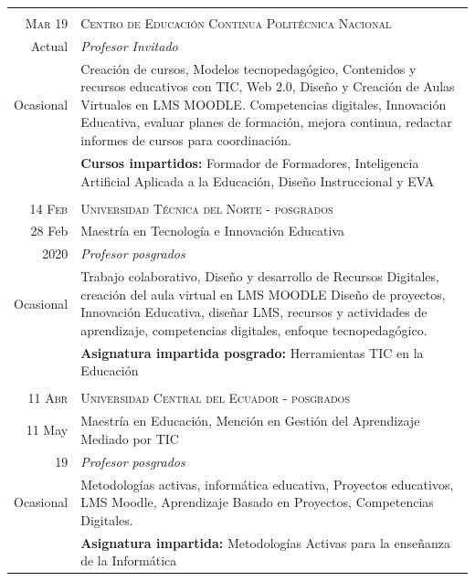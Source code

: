 \documentclass[a4paper]{article}
\begin{document}
\begin{longtable}{r|p{12cm}}
\multicolumn{2}{c}{} \\
\textsc{Mar 19} & \textsc{Centro de Educación Continua Politécnica Nacional} \\Actual
&\emph{Profesor Invitado}\\Ocasional&\footnotesize{Creación de cursos, Modelos tecnopedagógico, Contenidos y recursos educativos con TIC, Web 2.0, Diseño y Creación de Aulas Virtuales en LMS MOODLE. Competencias digitales, Innovación Educativa, evaluar planes de formación, mejora continua, redactar informes de cursos para coordinación.}\\ & \footnotesize{\textbf{Cursos impartidos:} Formador de Formadores, Inteligencia Artificial Aplicada a la Educación, Diseño Instruccional y EVA}\\

\multicolumn{2}{c}{} \\
\textsc{14 Feb} & \textsc{Universidad Técnica del Norte - posgrados} \\28 Feb& Maestría en Tecnología e Innovación Educativa\\
2020&\emph{Profesor posgrados}\\Ocasional&\footnotesize{Trabajo colaborativo, Diseño y desarrollo de Recursos Digitales, creación del aula virtual en LMS MOODLE Diseño de proyectos, Innovación Educativa, diseñar LMS, recursos y actividades de aprendizaje, competencias digitales, enfoque  tecnopedagógico.
}\\ & \footnotesize{\textbf{Asignatura impartida posgrado:} Herramientas TIC en la Educación}\\

 \multicolumn{2}{c}{} \\
\textsc{11 Abr} & \textsc{Universidad Central del Ecuador - posgrados} \\11 May
& Maestría en Educación, Mención en Gestión del Aprendizaje Mediado por TIC\\19
&\emph{Profesor posgrados}\\Ocasional&\footnotesize{Metodologías activas, informática educativa, Proyectos educativos, LMS Moodle, Aprendizaje Basado en Proyectos, Competencias Digitales.}
 \\ & \footnotesize{\textbf{Asignatura impartida:} Metodologías Activas para la enseñanza de la Informática}\\
\end{longtable}
\end{document}
